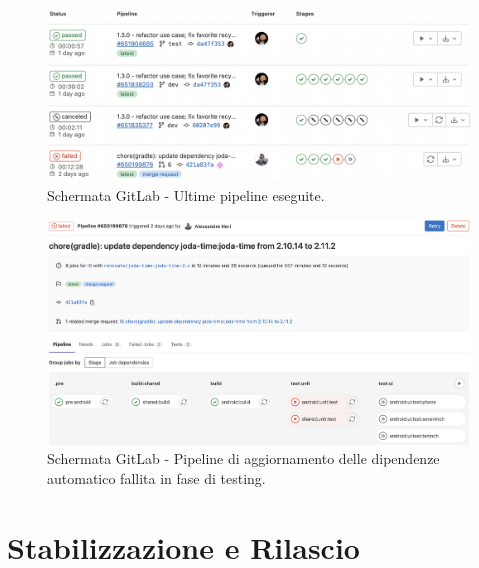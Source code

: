 \begin{figure}[H]
\centering
    \includegraphics[width=1\textwidth]{img/Screenshot 2022-09-28 at 15.58.43.png}
    \caption{Schermata GitLab - Ultime pipeline eseguite.}
    \label{pipelinesapp}
\end{figure}

\begin{figure}[H]
\centering
    \includegraphics[width=1\textwidth]{img/Screenshot 2022-09-28 at 15.54.26.png}
    \caption{Schermata GitLab - Pipeline di aggiornamento delle dipendenze automatico fallita in fase di testing.}
    \label{mergerequestrenova}
\end{figure}

\section{Stabilizzazione e Rilascio}

